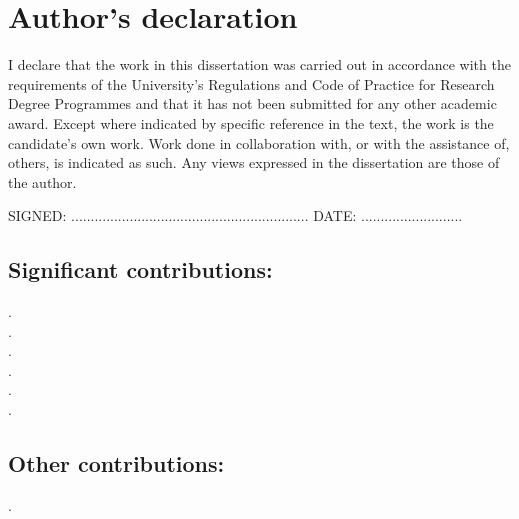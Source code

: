 \chapter*{Author's declaration}

I declare that the work in this dissertation was carried out in accordance with the requirements of the University's Regulations and Code of Practice for Research Degree Programmes and that it has not been submitted for any other academic award.
Except where indicated by specific reference in the text, the work is the candidate's own work.
Work done in collaboration with, or with the assistance of, others, is indicated as such. Any views expressed in the dissertation are those of the author.

\vspace{1cm}

SIGNED: .............................................................
\qquad
DATE: ..........................

\vspace{1cm}

\section*{Significant contributions:}

\cite{RobinsonPRL2019}\; . \\
\cite{GregsonJPCB2019}\; . \\
\cite{RobinsonPRE2019}\; . \\
\cite{RobinsonResummation2019}\; . \\
\cite{RobinsonTBD2019}\; . \\
\cite{GregsonTBD2019}\; . \\

\section*{Other contributions:}

\cite{RoyallJPCM2018}\; .
